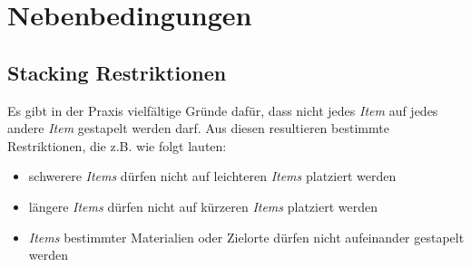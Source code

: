 \pagebreak

\section{Nebenbedingungen}
\label{sec:constraints}

\subsection{Stacking Restriktionen}
\label{sec:stacking_restrictions}

Es gibt in der Praxis vielfältige Gründe dafür, dass nicht jedes \textit{Item} auf jedes andere \textit{Item} gestapelt werden darf.
Aus diesen resultieren bestimmte Restriktionen, die z.B. wie folgt lauten:
\begin{itemize}
  \item schwerere \textit{Items} dürfen nicht auf leichteren \textit{Items} platziert werden
  \item längere \textit{Items} dürfen nicht auf kürzeren \textit{Items} platziert werden
  \item \textit{Items} bestimmter Materialien oder Zielorte dürfen nicht aufeinander gestapelt werden
\end{itemize}

